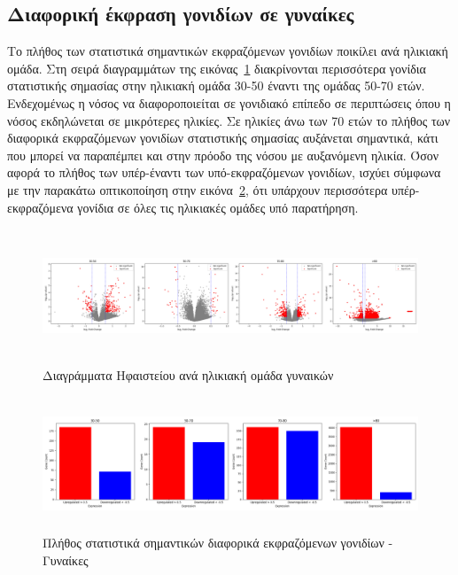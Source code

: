 \documentclass[12pt]{report}
\begin{document}
        \subsection{Διαφορική έκφραση γονιδίων σε γυναίκες}
         \par
            Το πλήθος των στατιστικά σημαντικών εκφραζόμενων γονιδίων ποικίλει ανά ηλικιακή ομάδα. Στη σειρά διαγραμμάτων της εικόνας~\ref{fig:volcano_plot_consoVisits_Female} διακρίνονται περισσότερα γονίδια στατιστικής σημασίας στην ηλικιακή ομάδα 30-50 έναντι της ομάδας 50-70 ετών. Ενδεχομένως η νόσος να διαφοροποιείται σε γονιδιακό επίπεδο σε περιπτώσεις όπου η νόσος εκδηλώνεται σε μικρότερες ηλικίες. Σε ηλικίες άνω των 70 ετών το πλήθος των διαφορικά εκφραζόμενων γονιδίων στατιστικής σημασίας αυξάνεται σημαντικά, κάτι που μπορεί να παραπέμπει και στην πρόοδο της νόσου με αυξανόμενη ηλικία. Όσον αφορά το πλήθος των υπέρ-έναντι των υπό-εκφραζόμενων γονιδίων, ισχύει σύμφωνα με την παρακάτω οπτικοποίηση στην εικόνα~\ref{fig:barplot_plot_consoVisits_Female}, ότι υπάρχουν περισσότερα υπέρ-εκφραζόμενα γονίδια σε όλες τις ηλικιακές ομάδες υπό παρατήρηση.
            \begin{figure}[h]
                \centering
                \includegraphics[width=\textwidth,height=4cm]{Chapter-3/volcano_plot_consoVisits_Female.png}
                \caption{Διαγράμματα Ηφαιστείου ανά ηλικιακή ομάδα γυναικών}
                \label{fig:volcano_plot_consoVisits_Female}
            \end{figure}
            \begin{figure}[H]
                \centering
                \includegraphics[width=\textwidth,height=4cm]{Chapter-3/barplot_plot_consoVisits_Female.png}
                \caption{Πλήθος στατιστικά σημαντικών διαφορικά εκφραζόμενων γονιδίων - Γυναίκες}
                \label{fig:barplot_plot_consoVisits_Female}
            \end{figure}
\end{document}
